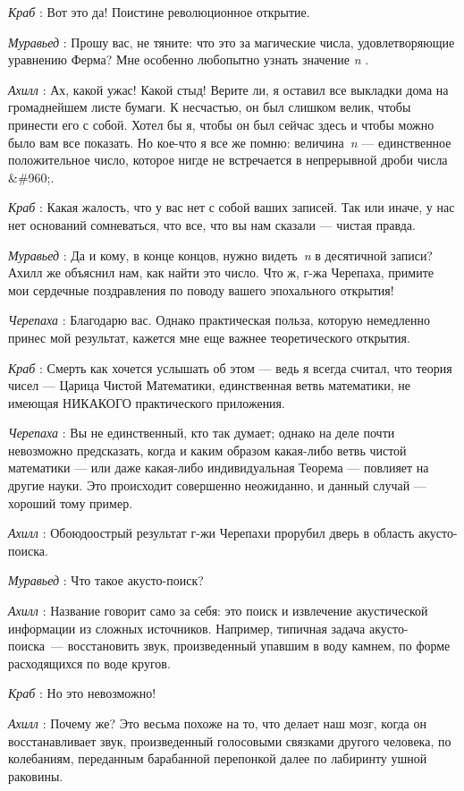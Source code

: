 \emph{Краб} : Вот это да! Поистине революционное открытие.

\emph{Муравьед} : Прошу вас, не тяните: что это за магические числа, удовлетворяющие уравнению Ферма? Мне особенно любопытно узнать значение \emph{n} .

\emph{Ахилл} : Ах, какой ужас! Какой стыд! Верите ли, я оставил все выкладки дома на громаднейшем листе бумаги. К несчастью, он был слишком велик, чтобы принести его с собой. Хотел бы я, чтобы он был сейчас здесь и чтобы можно было вам все показать. Но кое-что я все же помню: величина~\emph{n} --- единственное положительное число, которое нигде не встречается в непрерывной дроби числа \&\#960;.

\emph{Краб} : Какая жалость, что у вас нет с собой ваших записей. Так или иначе, у нас нет оснований сомневаться, что все, что вы нам сказали --- чистая правда.

\emph{Муравьед} : Да и кому, в конце концов, нужно видеть~\emph{n} в десятичной записи? Ахилл же объяснил нам, как найти это число. Что ж, г-жа Черепаха, примите мои сердечные поздравления по поводу вашего эпохального открытия!

\emph{Черепаха} : Благодарю вас. Однако практическая польза, которую немедленно принес мой результат, кажется мне еще важнее теоретического открытия.

\emph{Краб} : Смерть как хочется услышать об этом --- ведь я всегда считал, что теория чисел --- Царица Чистой Математики, единственная ветвь математики, не имеющая НИКАКОГО практического приложения.

\emph{Черепаха} : Вы не единственный, кто так думает; однако на деле почти невозможно предсказать, когда и каким образом какая-либо ветвь чистой математики --- или даже какая-либо индивидуальная Теорема --- повлияет на другие науки. Это происходит совершенно неожиданно, и данный случай --- хороший тому пример.

\emph{Ахилл} : Обоюдоострый результат г-жи Черепахи прорубил дверь в область акусто-поиска.

\emph{Муравьед} : Что такое акусто-поиск?

\emph{Ахилл} : Название говорит само за себя: это поиск и извлечение акустической информации из сложных источников. Например, типичная задача акусто-поиска~--- восстановить звук, произведенный упавшим в воду камнем, по форме расходящихся по воде кругов.

\emph{Краб} : Но это невозможно!

\emph{Ахилл} : Почему же? Это весьма похоже на то, что делает наш мозг, когда он восстанавливает звук, произведенный голосовыми связками другого человека, по колебаниям, переданным барабанной перепонкой далее по лабиринту ушной раковины.

